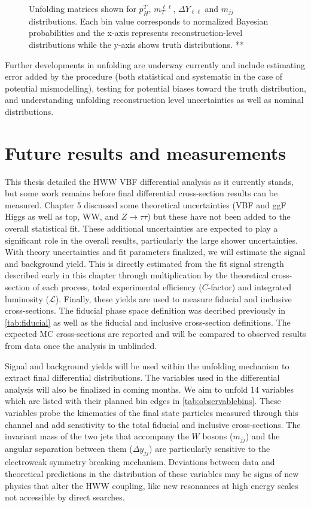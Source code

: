 \begin{figure}[!h]
{  }%
\caption{\label{fig:unfoldingmatrices}Unfolding matrices shown for $p^T_H$, $m_T^{\ell\ell}$, $\Delta Y_{\ell\ell}$ and $m_{jj}$ distributions. Each bin value corresponds to normalized Bayesian probabilities and the x-axis represents reconstruction-level distributions while the y-axis shows truth distributions. **}
\end{figure}  

Further developments in unfolding are underway currently and include estimating error added by the procedure (both statistical and systematic in the case of potential mismodelling), testing for potential biases toward the truth distribution, and understanding unfolding reconstruction level uncertainties as well as nominal distributions. 

\section{Future results and measurements}

This thesis detailed the HWW VBF differential analysis as it currently stands,  but some work remains before final differential cross-section results can be measured. Chapter 5 discussed some theoretical uncertainties (VBF and ggF Higgs as well as top, WW, and $Z\rightarrow \tau\tau$) but these have not been added to the overall statistical fit. These additional uncertainties are expected to play a significant role in the overall results, particularly the large shower uncertainties. With theory uncertainties and fit parameters finalized, we will estimate the signal and background yield. This is directly estimated from the fit signal strength described early in this chapter through multiplication by the theoretical cross-section of each process, total experimental efficiency ($C$-factor) and integrated luminosity ($\mathcal{L}$). Finally, these yields are used to measure fiducial and inclusive cross-sections. The fiducial phase space definition was decribed previously in \ref{tab:fiducial} as well as the fiducial and inclusive cross-section definitions. The expected MC cross-sections are reported and will be compared to observed results from data once the analysis in unblinded. 

Signal and background yields will be used within the unfolding mechanism to extract final differential distributions. The variables used in the differential analysis will also be finalized in coming months. We aim to unfold 14 variables which are listed with their planned bin edges in \ref{tab:observablebins}. These variables probe the kinematics of the final state particles measured through this channel and add sensitivity to the total fiducial and inclusive cross-sections. The invariant mass of the two jets that accompany the $W$ bosons ($m_{jj}$) and the angular separation between them ($\Delta y_{jj}$) are particularly sensitive to the electroweak symmetry breaking mechanism. Deviations between data and theoretical predictions in the distribution of these variables may be signs of new physics that alter the HWW coupling, like new resonances at high energy scales not accessible by direct searches.                

